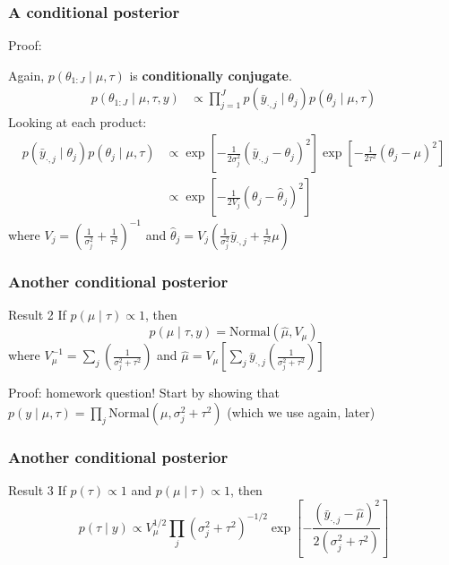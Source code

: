 \documentclass{beamer}
\begin{document}
\begin{frame}
\frametitle{A conditional posterior}

Proof:

Again, $p(\theta_{1:J} \mid \mu, \tau)$ is {\bf conditionally conjugate}. 
\begin{align*}
p(\theta_{1:J} \mid \mu, \tau, y) &\propto \prod_{j=1}^J p(\bar{y}_{\cdot,j} \mid \theta_j) p(\theta_j \mid \mu, \tau) 
\end{align*}
Looking at each product:
\begin{align*}
p(\bar{y}_{\cdot,j} \mid \theta_j) p(\theta_j \mid \mu, \tau) &\propto \exp\left[-\frac{1}{2 \sigma_j^2} \left(\bar{y}_{\cdot,j} - \theta_j \right)^2 \right]\exp\left[-\frac{1}{2 \tau^2} \left( \theta_j - \mu \right)^2 \right] \\
&\propto \exp\left[-\frac{1}{2 V_j}(\theta_j - \hat{\theta}_j)^2 \right]
\end{align*}
where $V_j = \left(\frac{1}{\sigma^2_j} + \frac{1}{\tau^2} \right)^{-1}$ and $\hat{\theta}_j = V_j\left(\frac{1}{\sigma^2_j} \bar{y}_{\cdot,j} + \frac{1}{\tau^2}\mu \right) $

\end{frame}

\begin{frame}
\frametitle{Another conditional posterior }

\begin{block}{Result 2}
If $p(\mu \mid \tau) \propto 1$, then
\[
p( \mu \mid \tau, y) = \text{Normal}(\hat{\mu}, V_{\mu})
\]
where $V_{\mu}^{-1} = \sum_{j} \left( \frac{1}{\sigma^2_j + \tau^2}\right)$  and $\hat{\mu} = V_{\mu} \left[ \sum_{j} \bar{y}_{\cdot,j}\left( \frac{1}{\sigma^2_j + \tau^2 }  \right) \right]$
\end{block}  

Proof: homework question! Start by showing that $p(y \mid \mu, \tau) = \prod_j \text{Normal}(\mu, \sigma^2_j + \tau^2)$ (which we use again, later)


\end{frame}

\begin{frame}
\frametitle{Another conditional posterior }

\begin{block}{Result 3}
If $p(\tau) \propto 1$ and $p(\mu \mid \tau) \propto 1$, then
\[
p( \tau \mid y) \propto V_{\mu}^{1/2} \prod_{j} (\sigma^2_j + \tau^2)^{-1/2} \exp\left[ -\frac{ (\bar{y}_{\cdot,j} - \hat{\mu})^2 }{2(\sigma^2_j + \tau^2)}\right]
\]
\end{block}
\end{frame}
\end{document}
